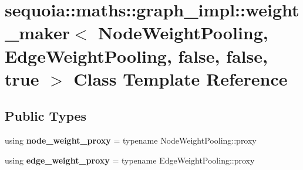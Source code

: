 \hypertarget{classsequoia_1_1maths_1_1graph__impl_1_1weight__maker_3_01_node_weight_pooling_00_01_edge_weightae6caf0d6d717c63a02de85d3731d5cd}{}\section{sequoia\+::maths\+::graph\+\_\+impl\+::weight\+\_\+maker$<$ Node\+Weight\+Pooling, Edge\+Weight\+Pooling, false, false, true $>$ Class Template Reference}
\label{classsequoia_1_1maths_1_1graph__impl_1_1weight__maker_3_01_node_weight_pooling_00_01_edge_weightae6caf0d6d717c63a02de85d3731d5cd}
\subsection*{Public Types}
\begin{DoxyCompactItemize}
\item 
\mbox{\label{classsequoia_1_1maths_1_1graph__impl_1_1weight__maker_3_01_node_weight_pooling_00_01_edge_weightae6caf0d6d717c63a02de85d3731d5cd_a13c8ab1de8483e2797423d158ee20fef}} 
using {\bfseries node\+\_\+weight\+\_\+proxy} = typename Node\+Weight\+Pooling\+::proxy
\item 
\mbox{\label{classsequoia_1_1maths_1_1graph__impl_1_1weight__maker_3_01_node_weight_pooling_00_01_edge_weightae6caf0d6d717c63a02de85d3731d5cd_aeddc132021f2c620dcd87742c25577b9}} 
using {\bfseries edge\+\_\+weight\+\_\+proxy} = typename Edge\+Weight\+Pooling\+::proxy
\end{DoxyCompactItemize}
